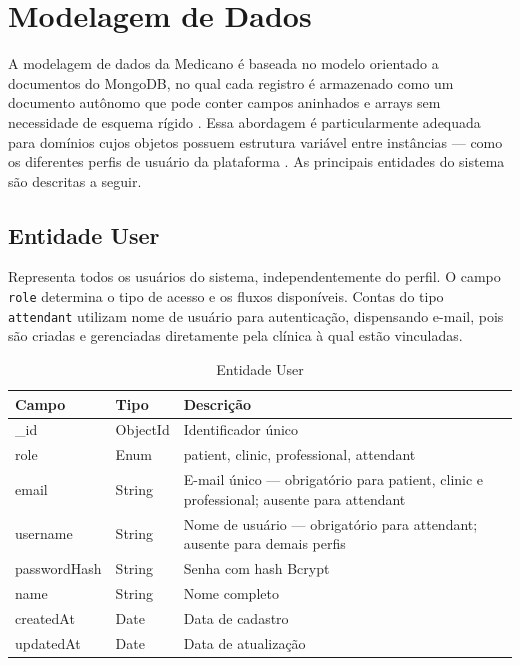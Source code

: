 \section{Modelagem de Dados}
\label{sec:data-modeling}

A modelagem de dados da Medicano é baseada no
modelo orientado a documentos do MongoDB, no qual
cada registro é armazenado como um documento
autônomo que pode conter campos aninhados e
arrays sem necessidade de esquema rígido
\cite{sadalage2012}. Essa abordagem é
particularmente adequada para domínios cujos
objetos possuem estrutura variável entre
instâncias --- como os diferentes perfis de
usuário da plataforma \cite{fowler2012nosql}.
As principais entidades do sistema são descritas
a seguir.

\subsection{Entidade User}
\label{subsec:entity-user}

Representa todos os usuários do sistema,
independentemente do perfil. O campo \texttt{role}
determina o tipo de acesso e os fluxos disponíveis.
Contas do tipo \texttt{attendant} utilizam nome de
usuário para autenticação, dispensando e-mail, pois
são criadas e gerenciadas diretamente pela clínica
à qual estão vinculadas.

\begin{table}[H]
  \centering
  \caption{Entidade User}
  \label{tab:entity-user}
  \begin{tabular}{p{3cm}p{3cm}p{5.5cm}}
    \toprule
    \textbf{Campo} &
    \textbf{Tipo} &
    \textbf{Descrição} \\
    \midrule
    \_id          & ObjectId  & Identificador único \\
    role          & Enum      & patient, clinic,
                               professional, attendant \\
    email         & String    & E-mail único ---
                               obrigatório para patient,
                               clinic e professional;
                               ausente para attendant \\
    username      & String    & Nome de usuário ---
                               obrigatório para attendant;
                               ausente para demais perfis \\
    passwordHash  & String    & Senha com hash Bcrypt \\
    name          & String    & Nome completo \\
    createdAt     & Date      & Data de cadastro \\
    updatedAt     & Date      & Data de atualização \\
    \bottomrule
  \end{tabular}
\end{table}

